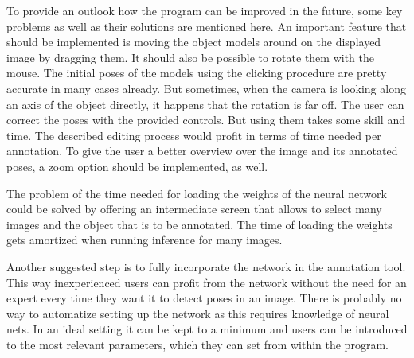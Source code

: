 To provide an outlook how the program can be improved in the future, some key problems as well as their solutions are mentioned here. An important feature that should be implemented is moving the object models around on the displayed image by dragging them. It should also be possible to rotate them with the mouse. The initial poses of the models using the clicking procedure are pretty accurate in many cases already. But sometimes, when the camera is looking along an axis of the object directly, it happens that the rotation is far off. The user can correct the poses with the provided controls. But using them takes some skill and time. The described editing process would profit in terms of time needed per annotation. To give the user a better overview over the image and its annotated poses, a zoom option should be implemented, as well.

The problem of the time needed for loading the weights of the neural network could be solved by offering an intermediate screen that allows to select many images and the object that is to be annotated. The time of loading the weights gets amortized when running inference for many images. 

Another suggested step is to fully incorporate the network in the annotation tool. This way inexperienced users can profit from the network without the need for an expert every time they want it to detect poses in an image. There is probably no way to automatize setting up the network as this requires knowledge of neural nets. In an ideal setting it can be kept to a minimum and users can be introduced to the most relevant parameters, which they can set from within the program.